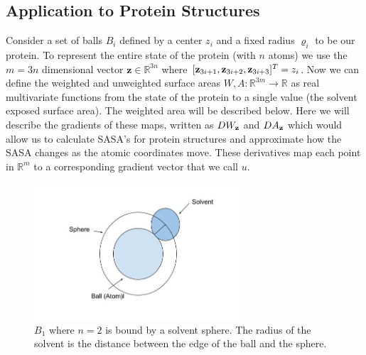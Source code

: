 \documentclass{article}
\newcommand{\R}{\mathbb{R}}
\begin{document}
\subsection{Application to Protein Structures}

Consider a set of balls $B_i$ defined by a center $z_i$ and a fixed radius $\varrho_i$ to be our protein. To represent the entire state of the protein (with $n$ atoms) we use the $m=3n$ dimensional  vector $\textbf{z}\in\R^{3n}$ where $\lbrack{\bf z}_{3i+1}, {\bf z}_{3i+2}, {\bf z}_{3i+3}\rbrack^T=z_i$. Now we can define the weighted and unweighted surface areas $W,A:\R^{3m}\rightarrow\R$ as real multivariate functions from the state of the protein to a single value (the solvent exposed surface area). The weighted area will be described below. Here we will describe the gradients of these maps, written as $DW_{\bf z}$ and $DA_{\bf z}$ which would allow us to calculate SASA's for protein structures and approximate how the SASA changes as the atomic coordinates move. These derivatives map each point in $\R^m$ to a corresponding gradient vector that we call $u$.

\begin{figure}[h!]
\caption{$B_1$ where $n = 2$ is bound by a solvent sphere. The radius of the solvent is the distance between the edge of the ball and the sphere.}
\centerline{\includegraphics[width=3in]{Figure8}}
\end{figure}
\end{document}
